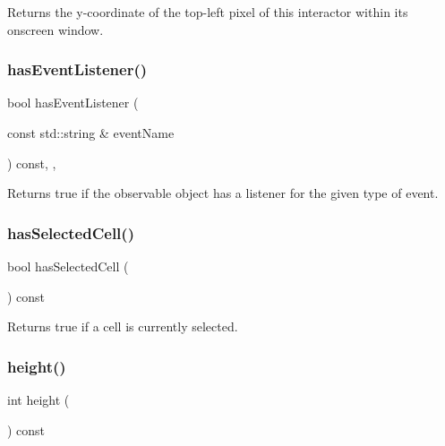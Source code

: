 Returns the y-\/coordinate of the top-\/left pixel of this interactor within its onscreen window. 

\mbox{\label{classGObservable_a9f6faaa25942923bafa1c44020c49fa9}} 
\subsubsection{\texorpdfstring{has\+Event\+Listener()}{hasEventListener()}}
{\footnotesize\ttfamily bool has\+Event\+Listener (\begin{DoxyParamCaption}\item[{const std\+::string \&}]{event\+Name }\end{DoxyParamCaption}) const\hspace{0.3cm}{\ttfamily [protected]}, {\ttfamily [virtual]}, {\ttfamily [inherited]}}



Returns true if the observable object has a listener for the given type of event. 

\mbox{\label{classGTable_a4a1007a3d14cd35f0bd514cc0b29886b}} 
\subsubsection{\texorpdfstring{has\+Selected\+Cell()}{hasSelectedCell()}}
{\footnotesize\ttfamily bool has\+Selected\+Cell (\begin{DoxyParamCaption}{ }\end{DoxyParamCaption}) const\hspace{0.3cm}{\ttfamily [virtual]}}



Returns true if a cell is currently selected. 

\mbox{\label{classGTable_ad3774f6419003470f54fd495124ef51f}} 
\subsubsection{\texorpdfstring{height()}{height()}}
{\footnotesize\ttfamily int height (\begin{DoxyParamCaption}{ }\end{DoxyParamCaption}) const\hspace{0.3cm}{\ttfamily [virtual]}}



